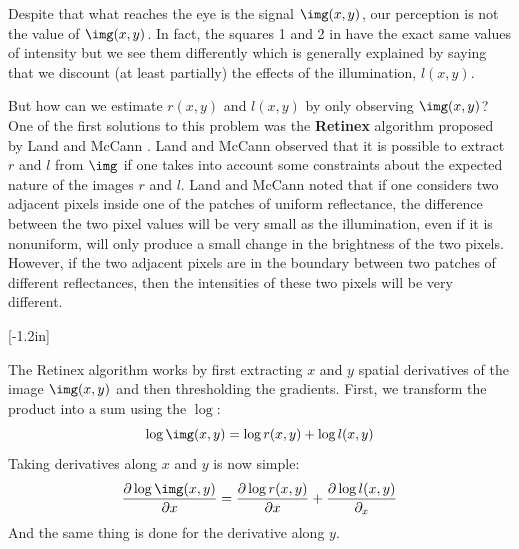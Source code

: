 Despite that what reaches the eye is the signal $\img(x,y)$, our perception is not the value of $\img(x,y)$. In fact, the squares 1 and 2 in \fig{\ref{fig:simultaneous}} have the exact same values of intensity but we see them differently which is generally explained by saying that we discount (at least partially) the effects of the illumination, $l(x,y)$. 

But how can we estimate $r(x,y)$ and $l(x,y)$ by only observing $\img(x,y)$? One of the first solutions to this problem was the {\bf Retinex} algorithm proposed by Land and McCann \cite{Land1971}. Land and McCann observed that it is possible to extract $r$ and $l$ from $\img$ if one takes into account some constraints about the expected nature of the images $r$ and $l$. Land and McCann noted that if one considers two adjacent pixels inside one of the patches of uniform reflectance, the difference between the two pixel values will be very small as the illumination, even if it is nonuniform, will only produce a small change in the brightness of the two pixels. However, if the two adjacent pixels are in the boundary between two patches of different reflectances, then the intensities of these two pixels will be very different. 

 [-1.2in]

The Retinex algorithm 
works by first extracting $x$ and $y$ spatial derivatives of the image $\img (x,y)$ and then thresholding the gradients.  First, we transform the product into a sum using the $\log$:
\begin{equation}
\log \img (x,y) = \log r(x,y) + \log l(x,y) 
\end{equation}
Taking derivatives along $x$ and $y$ is now simple:
\begin{equation}
\frac{\partial \log \img(x,y)}{ \partial x} = \frac{\partial \log r(x,y)}{ \partial x} + \frac{\partial \log l(x,y)}{ \partial_x} 
\end{equation}
And the same thing is done for the  derivative along $y$.

